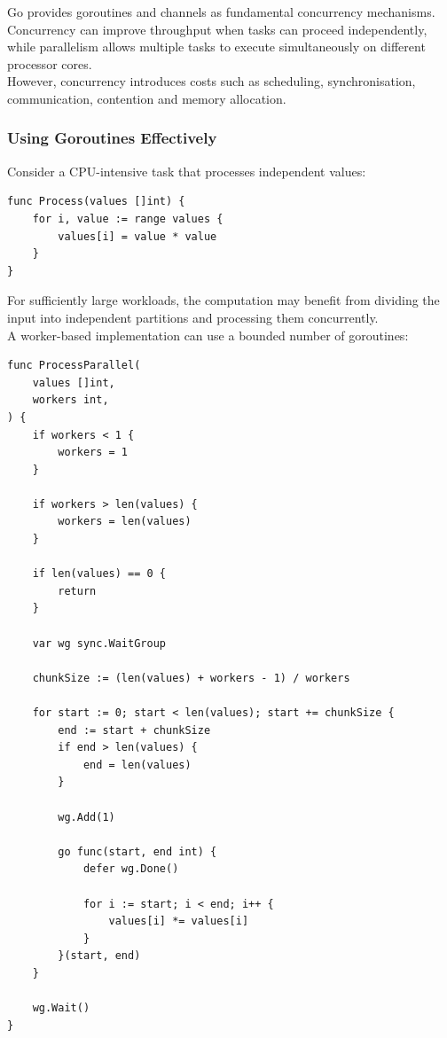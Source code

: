 Go provides goroutines and channels as fundamental concurrency mechanisms. Concurrency can improve throughput when tasks can proceed independently, while parallelism allows multiple tasks to execute simultaneously on different processor cores.\\

However, concurrency introduces costs such as scheduling, synchronisation, communication, contention and memory allocation.

\subsubsection{Using Goroutines Effectively}

Consider a CPU-intensive task that processes independent values:

\begin{lstlisting}
func Process(values []int) {
    for i, value := range values {
        values[i] = value * value
    }
}
\end{lstlisting}

For sufficiently large workloads, the computation may benefit from dividing the input into independent partitions and processing them concurrently.\\

A worker-based implementation can use a bounded number of goroutines:

\begin{lstlisting}
func ProcessParallel(
    values []int,
    workers int,
) {
    if workers < 1 {
        workers = 1
    }

    if workers > len(values) {
        workers = len(values)
    }

    if len(values) == 0 {
        return
    }

    var wg sync.WaitGroup

    chunkSize := (len(values) + workers - 1) / workers

    for start := 0; start < len(values); start += chunkSize {
        end := start + chunkSize
        if end > len(values) {
            end = len(values)
        }

        wg.Add(1)

        go func(start, end int) {
            defer wg.Done()

            for i := start; i < end; i++ {
                values[i] *= values[i]
            }
        }(start, end)
    }

    wg.Wait()
}
\end{lstlisting}

